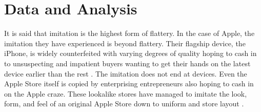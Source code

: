 \chapter{Data and Analysis}

It is said that imitation is the highest form of flattery. In the case of Apple,
the imitation they have experienced is beyond flattery. Their flagship device,
the iPhone, is widely counterfeited with varying degrees of quality hoping to
cash in to unsuspecting and impatient buyers wanting to get their hands on the
latest device earlier than the rest \autocite{justice_iphone_2015}. The imitation
does not end at devices. Even the Apple Store itself is copied by enterprising
entrepreneurs also hoping to cash in on the Apple craze. These lookalike stores
have managed to imitate the look, form, and feel of an original Apple Store down
to uniform and store layout \autocite{lee_chinas_2015}.




%


